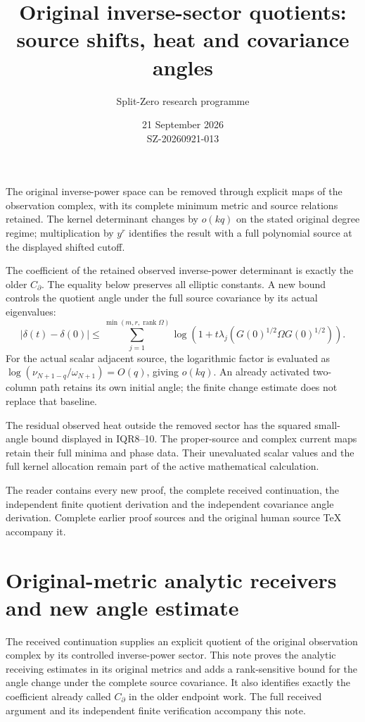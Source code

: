 \documentclass[11pt]{article}
\title{Original inverse-sector quotients:\\source shifts, heat and covariance angles}
\author{Split-Zero research programme}\date{21 September 2026\\SZ-20260921-013}
\begin{document}
\maketitle
The original inverse-power space can be removed through explicit maps of
the observation complex, with its complete minimum metric and source
relations retained. The kernel determinant changes by $o(kq)$ on the
stated original degree regime; multiplication by $y^r$ identifies the
result with a full polynomial source at the displayed shifted cutoff.

The coefficient of the retained observed inverse-power determinant is
exactly the older $C_\partial$. The equality below preserves all elliptic
constants. A new bound controls the quotient angle under the full source
covariance by its actual eigenvalues:
\[
|\delta(t)-\delta(0)|
\le\sum_{j=1}^{\min(m,r,\operatorname{rank}\Omega)}
 \log(1+t\lambda_j(G(0)^{1/2}\Omega G(0)^{1/2})).
\]
For the actual scalar adjacent source, the logarithmic factor is evaluated
as $\log(\nu_{N+1-q}/\omega_{N+1})=O(q)$, giving $o(kq)$.
An already activated two-column path retains its own initial angle;
the finite change estimate does not replace that baseline.

The residual observed heat outside the removed sector has the squared
small-angle bound displayed in IQR8--10. The proper-source and complex
current maps retain their full minima and phase data. Their unevaluated
scalar values and the full kernel allocation remain part of the active
mathematical calculation.

The reader contains every new proof, the complete received continuation,
the independent finite quotient derivation and the independent covariance
angle derivation. Complete earlier proof sources and the original human
source TeX accompany it.
\tableofcontents\clearpage
\clearpage\part{Original-metric analytic receivers and new angle estimate}

The received continuation supplies an explicit quotient of the original
observation complex by its controlled inverse-power sector. This note
proves the analytic receiving estimates in its original metrics and adds
a rank-sensitive bound for the angle change under the complete source
covariance. It also identifies exactly the coefficient already called
$C_\partial$ in the older endpoint work. The full received argument and
its independent finite verification accompany this note.
\end{document}
